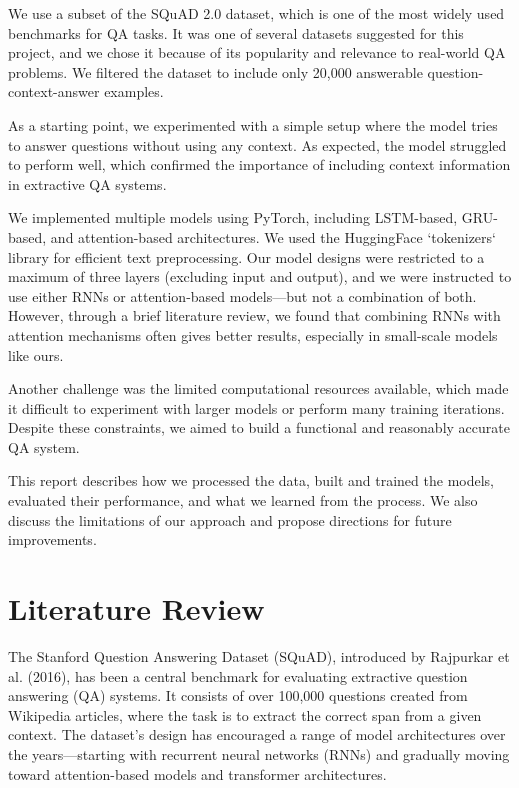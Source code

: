 \documentclass[runningheads]{llncs}
\begin{document}
We use a subset of the SQuAD 2.0 dataset, which is one of the most widely used benchmarks for QA tasks. It was one of several datasets suggested for this project, and we chose it because of its popularity and relevance to real-world QA problems. We filtered the dataset to include only 20,000 answerable question-context-answer examples.
\\
\par

As a starting point, we experimented with a simple setup where the model tries to answer questions without using any context. As expected, the model struggled to perform well, which confirmed the importance of including context information in extractive QA systems.
\\
\par

We implemented multiple models using PyTorch, including LSTM-based, GRU-based, and attention-based architectures. We used the HuggingFace `tokenizers` library for efficient text preprocessing. Our model designs were restricted to a maximum of three layers (excluding input and output), and we were instructed to use either RNNs or attention-based models—but not a combination of both. However, through a brief literature review, we found that combining RNNs with attention mechanisms often gives better results, especially in small-scale models like ours.
\\
\par

Another challenge was the limited computational resources available, which made it difficult to experiment with larger models or perform many training iterations. Despite these constraints, we aimed to build a functional and reasonably accurate QA system.
\\
\par

This report describes how we processed the data, built and trained the models, evaluated their performance, and what we learned from the process. We also discuss the limitations of our approach and propose directions for future improvements.
\par
	\section{Literature Review}
	
	The Stanford Question Answering Dataset (SQuAD), introduced by Rajpurkar et al. (2016), has been a central benchmark for evaluating extractive question answering (QA) systems. It consists of over 100,000 questions created from Wikipedia articles, where the task is to extract the correct span from a given context. The dataset’s design has encouraged a range of model architectures over the years—starting with recurrent neural networks (RNNs) and gradually moving toward attention-based models and transformer architectures.
\end{document}
